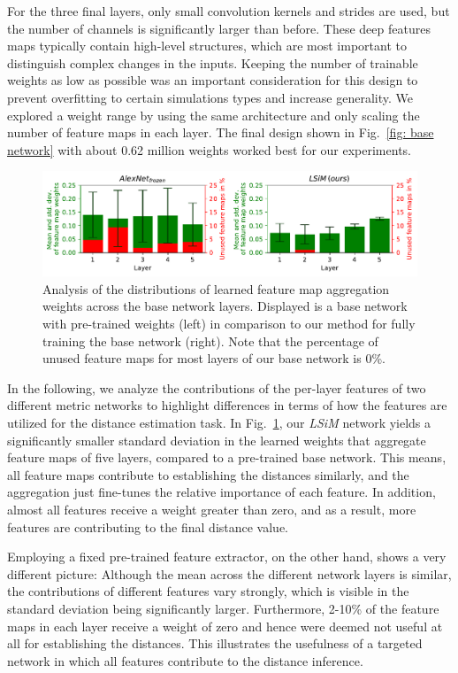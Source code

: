 For the three final layers, only small convolution kernels and strides are used, but the number of channels is significantly larger than before. These deep features maps typically contain high-level structures, which are most important to distinguish complex changes in the inputs. Keeping the number of trainable weights as low as possible was an important consideration for this design to prevent overfitting to certain simulations types and increase generality. We explored a weight range by using the same architecture and only scaling the number of feature maps in each layer. The final design shown in Fig.~\ref{fig: base network} with about 0.62 million weights worked best for our experiments.


\begin{figure}[ht]
    \centering
    \includegraphics[width=1.0\textwidth]{Images/FeatureMapWeights}
    \vspace{-0.9cm}
    \caption{Analysis of the distributions of learned feature map aggregation weights across the base network layers. Displayed is a base network with pre-trained weights (left) in comparison to our method for fully training the base network (right). Note that the percentage of unused feature maps for most layers of our base network is 0\%.}
    \label{fig: feature map weights}
\end{figure}

In the following, we analyze the contributions of the per-layer features of two different metric networks to highlight differences in terms of how the features are utilized for the distance estimation task.
In Fig.~\ref{fig: feature map weights}, our \textit{LSiM} network yields a significantly smaller standard deviation in the learned weights that aggregate feature maps of five layers, compared to a pre-trained base network. This means, all feature maps contribute to establishing the distances similarly, and the aggregation just fine-tunes the relative importance of each feature. In addition, almost all features receive a weight greater than zero, and as a result, more features are contributing to the final distance value.

Employing a fixed pre-trained feature extractor, on the other hand, shows a very different picture:
Although the mean across the different network layers is similar, the contributions of different features vary strongly, which is visible in the standard deviation being significantly larger. 
Furthermore, 2-10\% of the feature maps in each layer receive a weight of zero and 
hence were deemed not useful at all for establishing the distances.
This illustrates the usefulness of a targeted network in which all features contribute to the distance inference.


